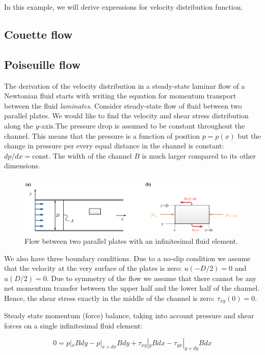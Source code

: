 In this example, we will derive expressions for velocity distribution function. 

\subsection{Couette flow}

\subsection{Poiseuille flow}

The derivation of the velocity distribution in a steady-state laminar flow of a Newtonian fluid starts with writing the equation for momentum transport between the fluid \textit{laminates}.
Consider steady-state flow of fluid between two parallel plates. We would like to find the velocity and shear stress distribution along the $y$-axis.The pressure drop is assumed to be constant throughout the channel. This means that the pressure is a function of position $p = p(x)$ but the change in pressure per every equal distance in the channel is constant: $dp/dx = \text{const}$. The width of the channel $B$ is much larger compared to its other dimensions.

\begin{figure}[H]
\centering\includegraphics[width=15cm]{plots/poiseuille-flow.pdf}
\caption{Flow between two parallel plates with an infinitesimal fluid element.}			
\label{fig:poiseuille-fluid-element}
\end{figure}

We also have three boundary conditions. Due to a no-slip condition we assume that the velocity at the very surface of the plates is zero: $u(-D/2) = 0$ and $u(D/2) = 0$. Due to symmetry of the flow we assume that there cannot be any net momentum transfer between the upper half and the lower half of the channel. Hence, the shear stress exactly in the middle of the channel is zero: $\tau_{xy}(0) = 0$.

Steady state momentum (force) balance, taking into account pressure and shear forces on a single infinitesimal fluid element:

\begin{equation}
0 = p|_x B dy - p|_{x+dx} B dy + \tau_{xy}|_y B dx - \tau_{yx}|_{y+dy} B dx
\end{equation}

